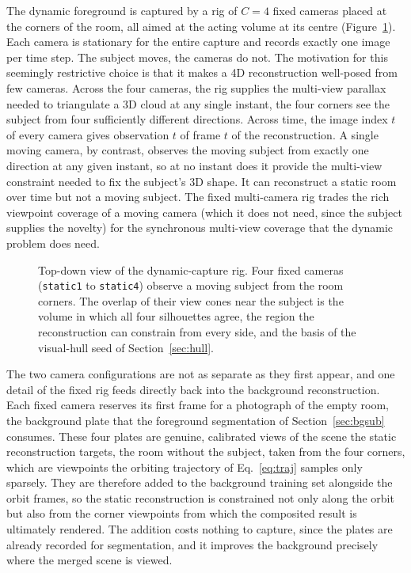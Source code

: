 The dynamic foreground is captured by a rig of $C =
4$ fixed cameras placed at the corners of the room, all aimed at the acting
volume at its centre (Figure~\ref{fig:camera-rig}). Each camera is stationary for
the entire capture and records exactly one image per time step. The subject moves,
the cameras do not. The motivation for this seemingly restrictive choice is that it
makes a 4D reconstruction well-posed from few cameras.
Across the four cameras, the rig supplies the multi-view parallax needed to
triangulate a 3D cloud at any single instant, the four corners see the subject from
four sufficiently different directions. Across time, the image index $t$ of
every camera gives observation $t$ of frame $t$ of the reconstruction. A single
moving camera, by contrast, observes the moving subject from exactly one direction
at any given instant, so at no instant does it provide the multi-view constraint
needed to fix the subject's 3D shape. It can reconstruct a static room over time but
not a moving subject. The fixed multi-camera rig trades the rich viewpoint coverage
of a moving camera (which it does not need, since the subject supplies the novelty)
for the synchronous multi-view coverage that the dynamic problem does need.

\begin{figure}[!ht]
    \centering
    
    \caption{Top-down view of the dynamic-capture rig. Four fixed cameras
    (\texttt{static1} to \texttt{static4}) observe a moving subject from the room
    corners. The overlap of their view cones near the subject is the volume in which
    all four silhouettes agree, the region the reconstruction can constrain from
    every side, and the basis of the visual-hull seed of Section~\ref{sec:hull}.}
    \label{fig:camera-rig}
\end{figure}

The two camera configurations are not as separate as they first appear, and one
detail of the fixed rig feeds directly back into the background reconstruction. Each
fixed camera reserves its first frame for a photograph of the empty room, the
background plate that the foreground segmentation of Section~\ref{sec:bgsub}
consumes. These four plates are genuine, calibrated views of the scene the
static reconstruction targets, the room without the subject, taken from the four
corners, which are viewpoints the orbiting trajectory of
Eq.~\eqref{eq:traj} samples only sparsely. They are therefore added to the
background training set alongside the orbit frames, so the static reconstruction is
constrained not only along the orbit but also from the corner viewpoints from which
the composited result is ultimately rendered. The addition costs nothing to capture,
since the plates are already recorded for segmentation, and it improves the
background precisely where the merged scene is viewed.

